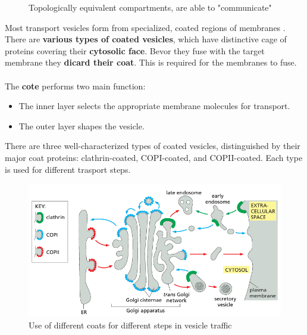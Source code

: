 \documentclass[../main.tex]{subfiles}
\begin{document}
\begin{figure}[H]
	\centering
	\caption{Topologically equivalent compartments, are able to "communicate"}
\end{figure}
\noindent
Most transport vesicles form from specialized, coated regions of membranes . There are \textbf{various types of coated vesicles}, which have distinctive cage of proteins covering their \textbf{cytosolic face}. Bevor they fuse with the target membrane they \textbf{dicard their coat}. This is required for the membranes to fuse. \\
\\
The \textbf{cote} performs two main function: 
\begin{itemize}
	\item The inner layer selects the appropriate membrane molecules for transport.
	\item The outer layer shapes the vesicle.
\end{itemize} 
There are three well-characterized types of coated vesicles, distinguished by their major coat proteins: clathrin-coated, COPI-coated, and COPII-coated. Each type is used for different trasport steps. 

\begin{figure}[H]
	\centering
	\includegraphics[width=0.65 \textwidth]{5}
	\caption{Use of different coats for different steps in vesicle traffic}
\end{figure}
\end{document}
